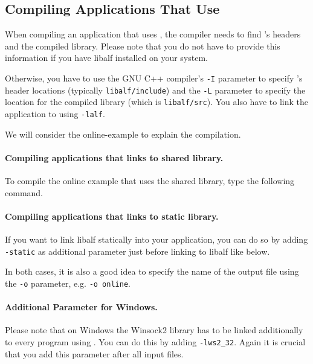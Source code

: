 \subsection{Compiling Applications That Use \libalf}
When compiling an application that uses \libalf, the compiler needs to find \libalf's headers and the compiled library. Please note that you do not have to provide this information if you have libalf installed on your system.

Otherwise, you have to use the GNU C++ compiler's \texttt{-I} parameter to specify \libalf's header locations (typically \texttt{libalf/include}) and the \texttt{-L} parameter to specify the location for the compiled library (which is \texttt{libalf/src}). You also have to link the application to \libalf using \texttt{-lalf}.

We will consider the online-example to explain the compilation.

\paragraph{Compiling applications that links to shared library.}
To compile the online example that uses the shared library, type the following command.


\paragraph{Compiling applications that links to static library.}
If you want to link libalf statically into your application, you can do so by adding \texttt{-static} as additional parameter just before linking to libalf like below.


In both cases, it is also a good idea to specify the name of the output file using the \texttt{-o} parameter, e.g. \texttt{-o online}.

\paragraph{Additional Parameter for Windows.}
Please note that on Windows the Winsock2 library has to be linked additionally to every program using \libalf. You can do this by adding \texttt{-lws2\_32}. Again it is crucial that you add this parameter after all input files.

